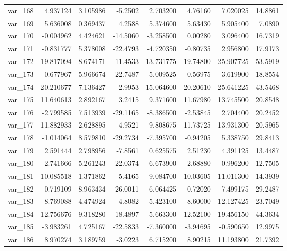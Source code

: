\documentclass[12pt]{article}
\begin{document}
\begin{longtable}{lrrrrrrr}
 var\_168 &   4.937124 &   3.105986 &  -5.2502 &   2.703200 &   4.76160 &   7.020025 &  14.8861 \\
 var\_169 &   5.636008 &   0.369437 &   4.2588 &   5.374600 &   5.63430 &   5.905400 &   7.0890 \\
 var\_170 &  -0.004962 &   4.424621 & -14.5060 &  -3.258500 &   0.00280 &   3.096400 &  16.7319 \\
 var\_171 &  -0.831777 &   5.378008 & -22.4793 &  -4.720350 &  -0.80735 &   2.956800 &  17.9173 \\
 var\_172 &  19.817094 &   8.674171 & -11.4533 &  13.731775 &  19.74800 &  25.907725 &  53.5919 \\
 var\_173 &  -0.677967 &   5.966674 & -22.7487 &  -5.009525 &  -0.56975 &   3.619900 &  18.8554 \\
 var\_174 &  20.210677 &   7.136427 &  -2.9953 &  15.064600 &  20.20610 &  25.641225 &  43.5468 \\
 var\_175 &  11.640613 &   2.892167 &   3.2415 &   9.371600 &  11.67980 &  13.745500 &  20.8548 \\
 var\_176 &  -2.799585 &   7.513939 & -29.1165 &  -8.386500 &  -2.53845 &   2.704400 &  20.2452 \\
 var\_177 &  11.882933 &   2.628895 &   4.9521 &   9.808675 &  11.73725 &  13.931300 &  20.5965 \\
 var\_178 &  -1.014064 &   8.579810 & -29.2734 &  -7.395700 &  -0.94205 &   5.338750 &  29.8413 \\
 var\_179 &   2.591444 &   2.798956 &  -7.8561 &   0.625575 &   2.51230 &   4.391125 &  13.4487 \\
 var\_180 &  -2.741666 &   5.261243 & -22.0374 &  -6.673900 &  -2.68880 &   0.996200 &  12.7505 \\
 var\_181 &  10.085518 &   1.371862 &   5.4165 &   9.084700 &  10.03605 &  11.011300 &  14.3939 \\
 var\_182 &   0.719109 &   8.963434 & -26.0011 &  -6.064425 &   0.72020 &   7.499175 &  29.2487 \\
 var\_183 &   8.769088 &   4.474924 &  -4.8082 &   5.423100 &   8.60000 &  12.127425 &  23.7049 \\
 var\_184 &  12.756676 &   9.318280 & -18.4897 &   5.663300 &  12.52100 &  19.456150 &  44.3634 \\
 var\_185 &  -3.983261 &   4.725167 & -22.5833 &  -7.360000 &  -3.94695 &  -0.590650 &  12.9975 \\
 var\_186 &   8.970274 &   3.189759 &  -3.0223 &   6.715200 &   8.90215 &  11.193800 &  21.7392 \\

\end{longtable}
\end{document}
